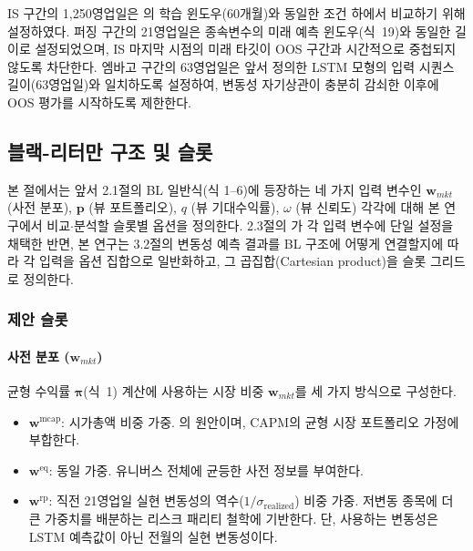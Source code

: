 \documentclass{article}
\begin{document}
IS 구간의 1,250영업일은 \citet{pyo2018}의 학습 윈도우(60개월)와 동일한 조건 하에서 비교하기 위해 설정하였다. 퍼징 구간의 21영업일은 종속변수의 미래 예측 윈도우(식~19)와 동일한 길이로 설정되었으며, IS 마지막 시점의 미래 타깃이 OOS 구간과 시간적으로 중첩되지 않도록 차단한다. 엠바고 구간의 63영업일은 앞서 정의한 LSTM 모형의 입력 시퀀스 길이(63영업일)와 일치하도록 설정하여, 변동성 자기상관이 충분히 감쇠한 이후에 OOS 평가를 시작하도록 제한한다.

\subsection{블랙-리터만 구조 및 슬롯}\label{sec:bl}

본 절에서는 앞서 2.1절의 BL 일반식(식 1--6)에 등장하는 네 가지 입력 변수인 $\mathbf{w}_{mkt}$ (사전 분포), $\mathbf{p}$ (뷰 포트폴리오), $q$ (뷰 기대수익률), $\omega$ (뷰 신뢰도) 각각에 대해 본 연구에서 비교$\cdot$분석할 슬롯별 옵션을 정의한다. 2.3절의 \citet{pyo2018}가 각 입력 변수에 단일 설정을 채택한 반면, 본 연구는 3.2절의 변동성 예측 결과를 BL 구조에 어떻게 연결할지에 따라 각 입력을 옵션 집합으로 일반화하고, 그 곱집합(Cartesian product)을 슬롯 그리드로 정의한다.

\subsubsection{제안 슬롯}\label{subsubsec:bl_proposed_slot}

\paragraph{사전 분포 ($\mathbf{w}_{mkt}$)}

균형 수익률 $\boldsymbol{\pi}$(식~1) 계산에 사용하는 시장 비중 $\mathbf{w}_{mkt}$를 세 가지 방식으로 구성한다.

\begin{itemize}
    \item $\mathbf{w}^{\mathrm{mcap}}$: 시가총액 비중 가중. \citet{pyo2018}의 원안이며, CAPM의 균형 시장 포트폴리오 가정에 부합한다.
    \item $\mathbf{w}^{\mathrm{eq}}$: 동일 가중. 유니버스 전체에 균등한 사전 정보를 부여한다.
    \item $\mathbf{w}^{\mathrm{rp}}$: 직전 21영업일 실현 변동성의 역수($1/\sigma_{\mathrm{realized}}$) 비중 가중. 저변동 종목에 더 큰 가중치를 배분하는 리스크 패리티\citep{maillard2010} 철학에 기반한다. 단, 사용하는 변동성은 LSTM 예측값이 아닌 전월의 실현 변동성이다.
\end{itemize}
\end{document}
